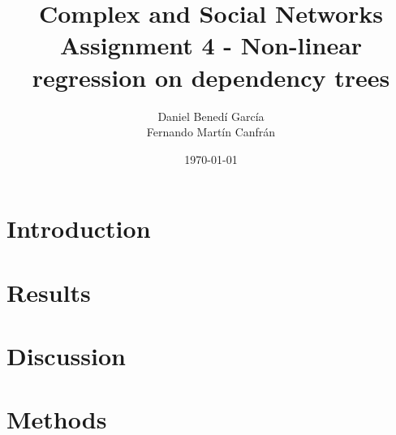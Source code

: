 \documentclass{article}
\title{Complex and Social Networks \\ Assignment 4 - Non-linear regression on dependency trees}
\author{Daniel Benedí García\\ Fernando Martín Canfrán}
\date{\monthyeardate\today}
\begin{document}
\maketitle
\begin{multicols}{2}
\tableofcontents
\end{multicols}

\section{Introduction}
\label{sec:introduction}


\section{Results}
\label{sec:results}


\section{Discussion}
\label{sec:discussion}


\section{Methods}
\label{sec:methods}


\printbibliography

\newpage
\appendix

\end{document}
